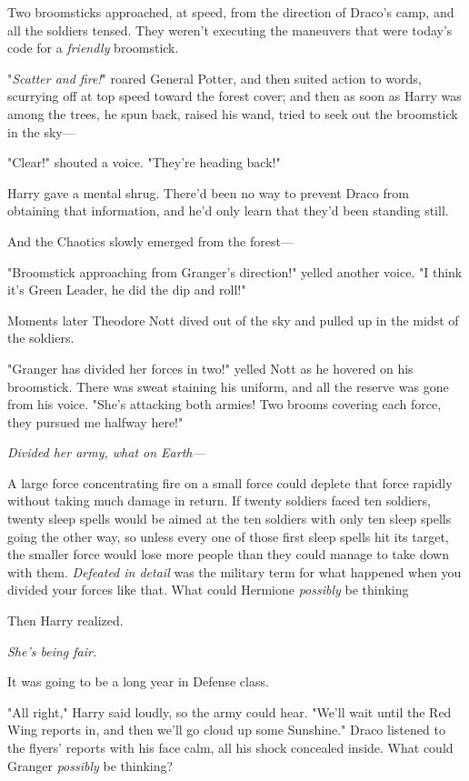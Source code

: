 Two broomsticks approached, at speed, from the direction of Draco's camp, and
all the soldiers tensed. They weren't executing the maneuvers that were today's
code for a \emph{friendly} broomstick.

"\emph{Scatter and fire!}" roared General Potter, and then suited action to
words, scurrying off at top speed toward the forest cover; and then as soon as
Harry was among the trees, he spun back, raised his wand, tried to seek out the
broomstick in the sky\mbox{---}

"Clear!" shouted a voice. "They're heading back!"

Harry gave a mental shrug. There'd been no way to prevent Draco from obtaining
that information, and he'd only learn that they'd been standing still.

And the Chaotics slowly emerged from the forest\mbox{---}

"Broomstick approaching from Granger's direction!" yelled another voice. "I
think it's Green Leader, he did the dip and roll!"

Moments later Theodore Nott dived out of the sky and pulled up in the midst of
the soldiers.

"Granger has divided her forces in two!" yelled Nott as he hovered on his
broomstick. There was sweat staining his uniform, and all the reserve was gone
from his voice. "She's attacking both armies! Two brooms covering each force,
they pursued me halfway here!"

\emph{Divided her army, what on Earth---}

A large force concentrating fire on a small force could deplete that force
rapidly without taking much damage in return. If twenty soldiers faced ten
soldiers, twenty sleep spells would be aimed at the ten soldiers with only ten
sleep spells going the other way, so unless every one of those first sleep
spells hit its target, the smaller force would lose more people than they could
manage to take down with them. \emph{Defeated in detail} was the military term
for what happened when you divided your forces like that. What could Hermione
\emph{possibly} be thinking{\el}

Then Harry realized.

\emph{She's being fair.}

It was going to be a long year in Defense class.

"All right," Harry said loudly, so the army could hear. "We'll wait until the
Red Wing reports in, and then we'll go cloud up some Sunshine."
\sbreak
Draco listened to the flyers' reports with his face calm, all his shock
concealed inside. What could Granger \emph{possibly} be thinking?

